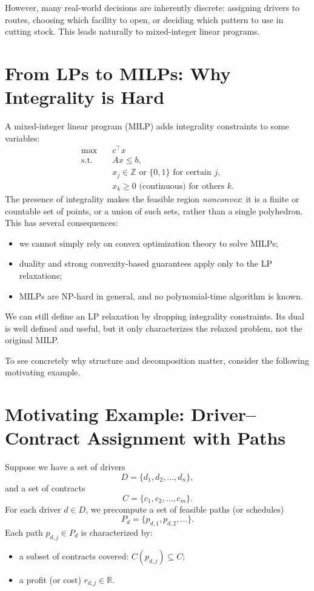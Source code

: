 \documentclass[11pt]{article}
\begin{document}
However, many real-world decisions are inherently discrete:
assigning drivers to routes, choosing which facility to open,
or deciding which pattern to use in cutting stock.
This leads naturally to mixed-integer linear programs.

\section{From LPs to MILPs: Why Integrality is Hard}

A mixed-integer linear program (MILP) adds integrality constraints to some
variables:
\begin{align*}
    \max \quad & c^\top x \\
    \text{s.t.} \quad & Ax \le b, \\
    & x_j \in \mathbb{Z} \text{ or } \{0,1\} \text{ for certain } j, \\
    & x_k \ge 0 \text{ (continuous) for others } k.
\end{align*}
The presence of integrality makes the feasible region \emph{nonconvex}: it is
a finite or countable set of points, or a union of such sets, rather than a
single polyhedron.
This has several consequences:
\begin{itemize}
    \item we cannot simply rely on convex optimization theory to solve MILPs;
    \item duality and strong convexity-based guarantees apply only to the LP relaxations;
    \item MILPs are NP-hard in general, and no polynomial-time algorithm is known.
\end{itemize}
We can still define an LP relaxation by dropping integrality constraints.
Its dual is well defined and useful, but it only characterizes the relaxed
problem, not the original MILP.

To see concretely why structure and decomposition matter, consider the following
motivating example.

\section{Motivating Example: Driver--Contract Assignment with Paths}

Suppose we have a set of drivers
\[
    D = \{d_1, d_2, \dots, d_n\},
\]
and a set of contracts
\[
    C = \{c_1, c_2, \dots, c_m\}.
\]
For each driver $d \in D$, we precompute a set of feasible paths (or schedules)
\[
    P_d = \{ p_{d,1}, p_{d,2}, \dots \}.
\]
Each path $p_{d,j} \in P_d$ is characterized by:
\begin{itemize}
    \item a subset of contracts covered: $C(p_{d,j}) \subseteq C$;
    \item a profit (or cost) $r_{d,j} \in \mathbb{R}$.
\end{itemize}
\end{document}
